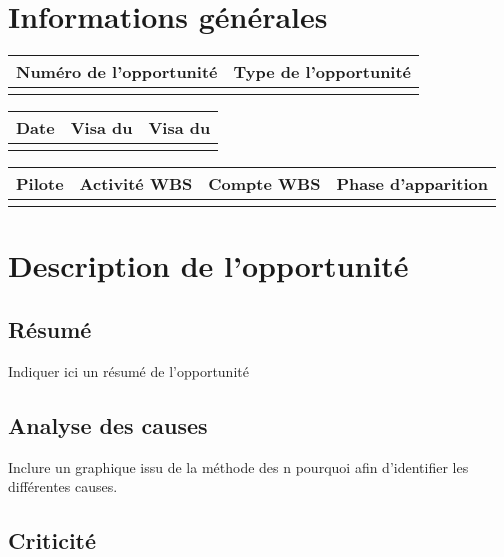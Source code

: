 \section*{Informations générales}
 
\begin{table}[H]
\centering
	\begin{tabularx}{16.8cm}{|X|X|}
	\hline
	\rowcolor{gray!40} Numéro de l'opportunité & Type de l'opportunité \\
	\hline
	 &  \\
	\hline
	\end{tabularx}
\end{table}

\begin{table}[H]
\centering
	\begin{tabularx}{16.8cm}{|X|X|X|}
	\hline
	\rowcolor{gray!40} Date & Visa du \RQ & Visa du \CP \\
	\hline
	  & & \\
	\hline
	\end{tabularx}
\end{table}

\begin{table}[H]
\centering
	\begin{tabularx}{16.8cm}{|X|X|X|X|}
	\hline
	\rowcolor{gray!40} Pilote & Activité WBS & Compte WBS & Phase d'apparition \\
	\hline
	  & & &\\
	\hline
	\end{tabularx}
\end{table}

\section*{Description de l'opportunité}

\subsection*{Résumé}
	Indiquer ici un résumé de l'opportunité
	
\subsection*{Analyse des causes}
	Inclure un graphique issu de la méthode des n pourquoi afin d'identifier les différentes causes.

\subsection*{Criticité}

